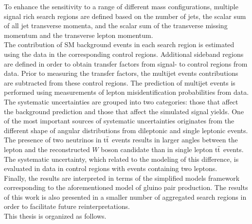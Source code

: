 To enhance the sensitivity to a range of different mass configurations, multiple signal rich search regions are defined based on the number of jets, the scalar sum of all jet transverse momenta, and the scalar sum of the transverse missing momentum and the transverse lepton momentum.\\
The contribution of SM background events in each search region is estimated using the data in the corresponding control regions. Additional sideband regions are defined in order to obtain transfer factors from signal- to control regions from data. Prior to measuring the transfer factors, the multijet events contributions are subtracted from these control regions. The prediction of multijet events is performed using measurements of lepton misidentification probabilities from data.\\
The systematic uncertainties are grouped into two categories: those that affect the background prediction and those that affect the simulated signal yields. One of the most important sources of systematic uncertainties originates from the different shape of angular distributions from dileptonic and single leptonic events. The presence of two neutrinos in $\rm t\bar{t}$ events results in larger angles between the lepton and the reconstructed $W$ boson candidate than in single lepton $\rm t\bar{t}$ events. The systematic uncertainty, which related to the modeling of this difference, is evaluated in data in control regions with events containing two leptons.\\
Finally, the results are interpreted in terms of the simplified models framework corresponding to the aforementioned model of gluino pair production. The results of this work is also presented in a smaller number of aggregated search regions in order to facilitate future reinterpretations.\\

This thesis is organized as follows.

